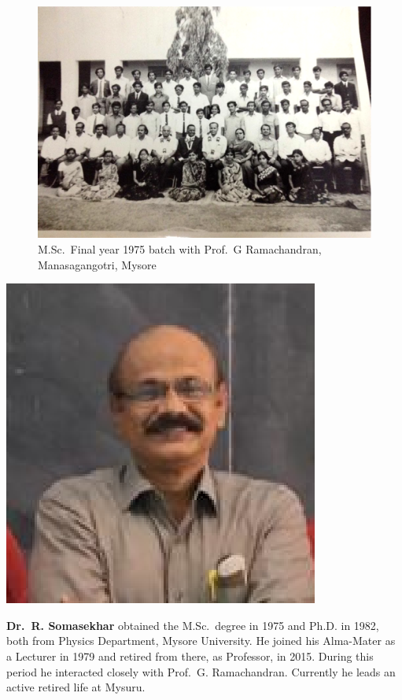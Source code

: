 \begin{figure}[H]
\centering
\includegraphics[scale=0.278]{src/images/chap8/8.eps}
\caption{M.Sc.\ Final year 1975 batch with Prof.\ G Ramachandran, Manasagangotri, Mysore}
\end{figure}
\vskip 1cm

\centerline{\includegraphics[scale=.8]{authorsphotos/Somasekhar.eps}}
\bigskip

\noindent
\textbf{Dr.\ R. Somasekhar} obtained the M.Sc.\ degree in 1975 and Ph.D. in 1982, both from Physics Department, Mysore University. 
He joined his Alma-Mater as a Lecturer in 1979 and retired from there, as Professor, in 2015. During this period he interacted closely with 
Prof.\ G. Ramachandran. Currently he leads an active retired life at Mysuru.
